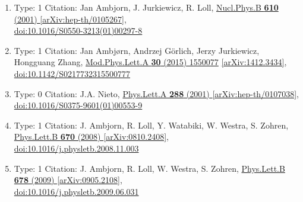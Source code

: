 \documentclass[a4paper,10pt]{article}
\begin{document}
\begin{enumerate}
\begin{enumerate}
  \item Type: 1 Citation: Jan Ambjorn, J. Jurkiewicz, R. Loll, \href{https://www.doi.org/10.1016/S0550-3213(01)00297-8}{Nucl.Phys.B {\bf 610} (2001) }  \href{https://arxiv.org/abs/hep-th/0105267}{[arXiv:hep-th/0105267]},\\\href{https://www.doi.org/10.1016/S0550-3213(01)00297-8}{doi:10.1016/S0550-3213(01)00297-8}
  \item Type: 1 Citation: Jan Ambjørn, Andrzej Görlich, Jerzy Jurkiewicz, Hongguang Zhang, \href{https://www.doi.org/10.1142/S0217732315500777}{Mod.Phys.Lett.A {\bf 30} (2015) 1550077}  \href{https://arxiv.org/abs/1412.3434}{[arXiv:1412.3434]},\\\href{https://www.doi.org/10.1142/S0217732315500777}{doi:10.1142/S0217732315500777}
  \item Type: 0 Citation: J.A. Nieto, \href{https://www.doi.org/10.1016/S0375-9601(01)00553-9}{Phys.Lett.A {\bf 288} (2001) }  \href{https://arxiv.org/abs/hep-th/0107038}{[arXiv:hep-th/0107038]},\\\href{https://www.doi.org/10.1016/S0375-9601(01)00553-9}{doi:10.1016/S0375-9601(01)00553-9}
  \item Type: 1 Citation: J. Ambjorn, R. Loll, Y. Watabiki, W. Westra, S. Zohren, \href{https://www.doi.org/10.1016/j.physletb.2008.11.003}{Phys.Lett.B {\bf 670} (2008) }  \href{https://arxiv.org/abs/0810.2408}{[arXiv:0810.2408]},\\\href{https://www.doi.org/10.1016/j.physletb.2008.11.003}{doi:10.1016/j.physletb.2008.11.003}
  \item Type: 1 Citation: J. Ambjorn, R. Loll, W. Westra, S. Zohren, \href{https://www.doi.org/10.1016/j.physletb.2009.06.031}{Phys.Lett.B {\bf 678} (2009) }  \href{https://arxiv.org/abs/0905.2108}{[arXiv:0905.2108]},\\\href{https://www.doi.org/10.1016/j.physletb.2009.06.031}{doi:10.1016/j.physletb.2009.06.031}

\end{enumerate}
\end{enumerate}
\end{document}
